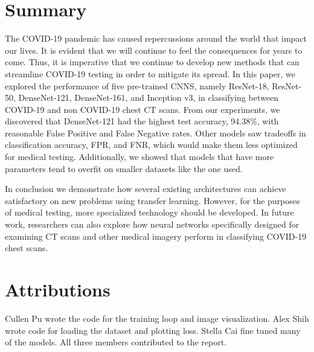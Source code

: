 \documentclass{article}
\begin{document}
\section{Summary}
The COVID-19 pandemic has caused repercussions around the world that impact our lives. It is evident that we will continue to feel the consequences for years to come. Thus, it is imperative that we continue to develop new methods that can streamline COVID-19 testing in order to mitigate its spread. In this paper, we explored the performance of five pre-trained CNNS, namely ResNet-18, ResNet-50, DenseNet-121, DenseNet-161, and Inception v3, in classifying between COVID-19 and non COVID-19 chest CT scans. From our experiments, we discovered that DenseNet-121 had the highest test accuracy, 94.38\%, with reasonable False Positive and False Negative rates. Other models saw tradeoffs in classification accuracy, FPR, and FNR, which would make them less optimized for medical testing. Additionally, we showed that models that have more parameters tend to overfit on smaller datasets like the one used.

 In conclusion we demonstrate how several existing architectures can achieve satisfactory on new problems using transfer learning. However, for the purposes of medical testing, more specialized technology should be developed. In future work, researchers can also explore how neural networks specifically designed for examining CT scans and other medical imagery perform in classifying COVID-19 chest scans.

\newpage

\section{Attributions}
Cullen Pu wrote the code for the training loop and image visualization. Alex Shih wrote code for loading the dataset and plotting loss. Stella Cai fine tuned many of the models. All three members contributed to the report.

\printbibliography
\end{document}
